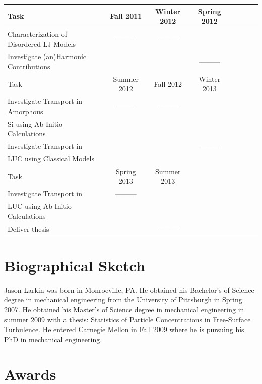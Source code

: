 \documentclass[letterpaper,12pt]{article}
\begin{document}
\begin{tabular}{l*{6}{c}r}
Task              				& Fall 2011 & Winter 2012 & Spring 2012  \\
\hline
Characterization of Disordered LJ Models 	& --------- & --------- &  \\
\hline
Investigate (an)Harmonic Contributions	&  &  & --------- \\
\hline
Task  							& Summer 2012 & Fall 2012  & Winter 2013 \\
\hline
Investigate Transport in Amorphous  	& --------- & ---------   &  \\
Si using Ab-Initio Calculations \\
\hline
Investigate Transport in 	& & & --------- \\
LUC using Classical Models \\
\hline
Task  							& Spring 2013 & Summer 2013 & \\
\hline
Investigate Transport in 	& --------- & &  \\
LUC using Ab-Initio Calculations \\
\hline
Deliver thesis					& & --------- & \\						
\end{tabular}

\vspace{1cm}


\clearpage

\section{Biographical Sketch} 
Jason Larkin was born in Monroeville, PA.  He obtained his Bachelor's of Science degree
in mechanical engineering from the University of Pittsburgh in
Spring 2007. He obtained his Master's of Science degree in mechanical engineering in summer 2009 with a thesis: Statistics of Particle Concentrations in Free-Surface Turbulence. He entered Carnegie Mellon in Fall 2009 where he is pursuing his PhD in mechanical engineering.

\section*{\label{S-awards}Awards}
\end{document}
